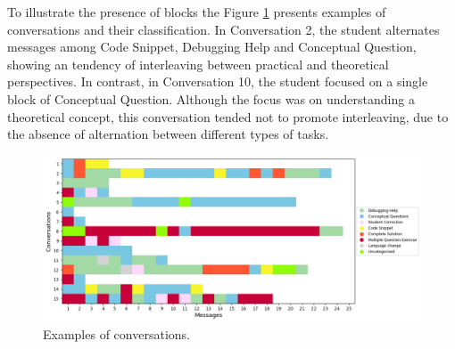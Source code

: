 \documentclass[a4paper,twoside]{article}
\begin{document}
To illustrate the presence of blocks the Figure \ref{fig:graph2} presents
examples of conversations and their classification. In Conversation 2, the
student alternates messages among Code Snippet, Debugging Help and Conceptual
Question, showing an tendency of interleaving between practical and theoretical
perspectives. In contrast, in Conversation 10, the student focused on a single
block of Conceptual Question. Although the focus was on understanding a
theoretical concept, this conversation tended not to promote interleaving, due
to the absence of alternation between different types of tasks.

\begin{figure}[htbp]
  \centering
  \includegraphics[scale=0.52]{img/figure2.png}
  \caption{Examples of conversations.}
  \label{fig:graph2}
\end{figure}



\end{document}
